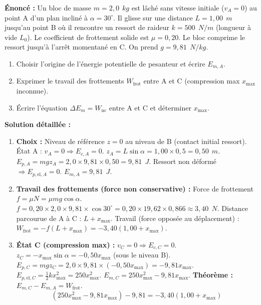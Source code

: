 \documentclass[11pt]{article}
\begin{document}
\begin{exoresolu}
    \textbf{Énoncé :} Un bloc de masse $m = 2,0\ \SI{}{kg}$ est lâché sans vitesse initiale ($v_A=0$) au point A d'un plan incliné à $\alpha = 30^\circ$. Il glisse sur une distance $L = 1,00\ \SI{}{m}$ jusqu'au point B où il rencontre un ressort de raideur $k = 500\ \SI{}{N/m}$ (longueur à vide $L_0$). Le coefficient de frottement solide est $\mu = 0,20$. Le bloc comprime le ressort jusqu'à l'arrêt momentané en C. On prend $g = 9,81\ \SI{}{N/kg}$.
    \begin{enumerate}
        \item Choisir l'origine de l'énergie potentielle de pesanteur et écrire $E_{m,A}$.
        \item Exprimer le travail des frottements $W_{\text{frot}}$ entre A et C (compression max $x_{\max}$ inconnue).
        \item Écrire l'équation $\Delta E_m = W_{\text{nc}}$ entre A et C et déterminer $x_{\max}$.
    \end{enumerate}
    \tcblower
    \textbf{Solution détaillée :}
    \begin{enumerate}
        \item \textbf{Choix :} Niveau de référence $z=0$ au niveau de B (contact initial ressort).
        État A : $v_A=0 \Rightarrow E_{c,A}=0$. $z_A = L \sin\alpha = 1,00 \times 0,5 = 0,50\ \SI{}{m}$.
        $E_{p,A} = m g z_A = 2,0 \times 9,81 \times 0,50 = 9,81\ \SI{}{J}$.
        Ressort non déformé $\Rightarrow E_{p,\text{el},A} = 0$.
        $\boxed{E_{m,A} = 9,81\ \SI{}{J}}$.
        \item \textbf{Travail des frottements (force non conservative) :}
        Force de frottement $f = \mu N = \mu m g \cos\alpha$.
        $f = 0,20 \times 2,0 \times 9,81 \times \cos 30^\circ = 0,20 \times 19,62 \times 0,866 \approx 3,40\ \SI{}{N}$.
        Distance parcourue de A à C : $L + x_{\max}$.
        Travail (force opposée au déplacement) : $W_{\text{frot}} = - f (L + x_{\max}) = -3,40 (1,00 + x_{\max})$.
        \item \textbf{État C (compression max) :} $v_C = 0 \Rightarrow E_{c,C} = 0$.
        $z_C = - x_{\max} \sin\alpha = -0,50 x_{\max}$ (sous le niveau B).
        $E_{p,C} = m g z_C = 2,0 \times 9,81 \times (-0,50 x_{\max}) = -9,81 x_{\max}$.
        $E_{p,\text{el},C} = \frac{1}{2} k x_{\max}^2 = 250 x_{\max}^2$.
        $E_{m,C} = 250 x_{\max}^2 - 9,81 x_{\max}$.
        \textbf{Théorème :} $E_{m,C} - E_{m,A} = W_{\text{frot}}$.
        \[ (250 x_{\max}^2 - 9,81 x_{\max}) - 9,81 = -3,40 (1,00 + x_{\max}) \]

\end{enumerate}
\end{exoresolu}
\end{document}
